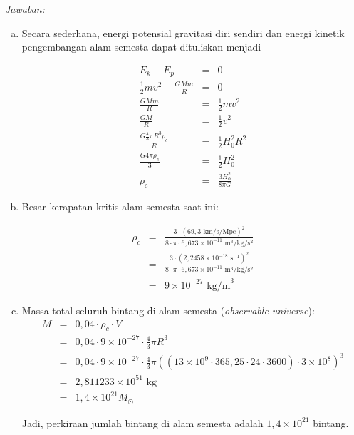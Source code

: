 \documentclass[11pt,fleqn]{exam}
\begin{document}
\begin{questions}
\textit{Jawaban: }\\
\begin{enumerate}[(a)]
\item Secara sederhana, energi potensial gravitasi diri sendiri dan energi kinetik pengembangan alam semesta dapat dituliskan menjadi

\begin{eqnarray*}
E_k + E_p &=& 0 \\
\frac{1}{2} m v^2 - \frac{GMm}{R} &=& 0\\
\frac{GMm}{R} &=& \frac{1}{2} m v^2\\
\frac{GM}{R} &=& \frac{1}{2} v^2\\
\frac{G \frac{4}{3} \pi R^3 \rho_c}{ R } &=& \frac{1}{2} H_0^2 R^2\\
\frac{G 4 \pi \rho_c}{3} &=& \frac{1}{2} H_0^2\\
\rho_c &=& \frac{3 H_0^2}{8 \pi G}
\end{eqnarray*}

\item Besar kerapatan kritis alam semesta saat ini:

\begin{eqnarray*}
\rho_c &=& \frac{3 \cdot (69,3 \text{  km/s/Mpc})^2}{8 \cdot \pi \cdot 6,673 \times 10^{-11} \text{  m}^3/\text{kg}/\text{s}^2} \\
&=& \frac{3 \cdot (2,2458 \times 10^{-18} \text{  s}^{-1})^2}{8 \cdot \pi \cdot 6,673 \times 10^{-11} \text{  m}^3/\text{kg}/\text{s}^2}\\
&=& 9\times 10^{-27} \text{   kg/m}^3
\end{eqnarray*}

\item Massa total seluruh bintang di alam semesta (\textit{observable universe}):
\begin{eqnarray*}
M &=& 0,04 \cdot \rho_c \cdot V\\
&=& 0,04 \cdot 9\times 10^{-27} \cdot \frac{4}{3} \pi R^3\\
&=& 0,04 \cdot 9\times 10^{-27} \cdot \frac{4}{3} \pi \left((13 \times 10^9 \cdot 365,25 \cdot 24 \cdot 3600) \cdot 3 \times 10^8 \right)^3\\
&=& 2,811233 \times 10^{51} \text{  kg}\\
&=& 1,4 \times 10^{21} M_{\odot}
\end{eqnarray*}

Jadi, perkiraan jumlah bintang di alam semesta adalah $1,4 \times 10^{21}$ bintang.
\end{enumerate}





\end{questions}
\end{document}
